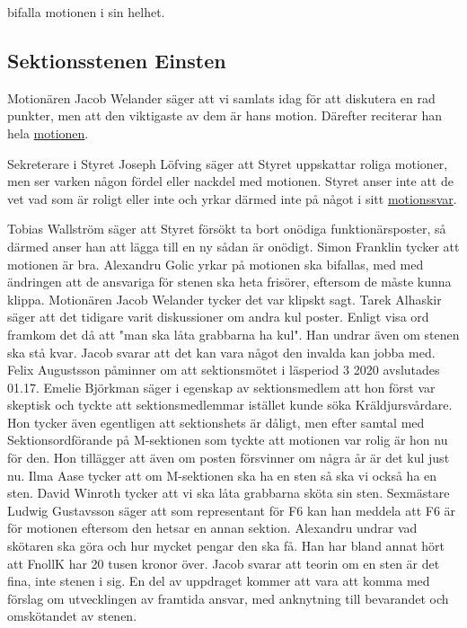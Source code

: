 \documentclass[hidelinks]{sektionsmote} %
\begin{document}
\begin{beslut}
  \item bifalla motionen i sin helhet.
\end{beslut}

\subsection{Sektionsstenen Einsten}
Motionären Jacob Welander säger att vi samlats idag för att diskutera en rad punkter, men att den viktigaste av dem är hans motion.
Därefter reciterar han hela \hyperlink{bilagor/motionfnollk.pdf.1}{motionen}.

Sekreterare i Styret Joseph Löfving säger att Styret uppskattar roliga motioner, men ser varken någon fördel eller nackdel med motionen.
Styret anser inte att de vet vad som är roligt eller inte och yrkar därmed inte på något i sitt \hyperlink{bilagor/motionfnollk.svar.pdf.1}{motionssvar}.

Tobias Wallström säger att Styret försökt ta bort onödiga funktionärsposter, så därmed anser han att lägga till en ny sådan är onödigt.
Simon Franklin tycker att motionen är bra.
Alexandru Golic yrkar på motionen ska bifallas, med med ändringen att de ansvariga för stenen ska heta frisörer, eftersom de måste kunna klippa.
Motionären Jacob Welander tycker det var klipskt sagt.
Tarek Alhaskir säger att det tidigare varit diskussioner om andra kul poster.
Enligt visa ord framkom det då att "man ska låta grabbarna ha kul".
Han undrar även om stenen ska stå kvar.
Jacob svarar att det kan vara något den invalda kan jobba med.
Felix Augustsson påminner om att sektionsmötet i läsperiod 3 2020 avslutades 01.17.
Emelie Björkman säger i egenskap av sektionsmedlem att hon först var skeptisk och tyckte att sektionsmedlemmar istället kunde söka Kräldjursvårdare.
Hon tycker även egentligen att sektionshets är dåligt, men efter samtal med Sektionsordförande på M-sektionen som tyckte att motionen var rolig är hon nu för den.
Hon tillägger att även om posten försvinner om några år är det kul just nu.
Ilma Aase tycker att om M-sektionen ska ha en sten så ska vi också ha en sten.
David Winroth tycker att vi ska låta grabbarna sköta sin sten.
Sexmästare Ludwig Gustavsson säger att som representant för F6 kan han meddela att F6 är för motionen eftersom den hetsar en annan sektion.
Alexandru undrar vad skötaren ska göra och hur mycket pengar den ska få.
Han har bland annat hört att FnollK har 20 tusen kronor över.
Jacob svarar att teorin om en sten är det fina, inte stenen i sig.
En del av uppdraget kommer att vara att komma med förslag om utvecklingen av framtida ansvar, med anknytning till bevarandet och omskötandet av stenen.
\end{document}
